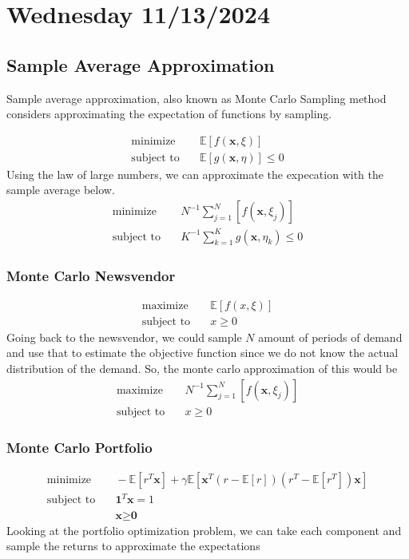 \section{Wednesday 11/13/2024}
\subsection{Sample Average Approximation}
Sample average approximation, also known as Monte Carlo Sampling method considers approximating the expectation of functions by sampling.

\begin{align}
  \text{minimize} & \quad \mathbb{E}[f(\textbf{x},\xi)] \\
  \text{subject to} & \quad  \mathbb{E}[g(\textbf{x},\eta)] \leq 0
\end{align}
Using the law of large numbers, we can approximate the expecation with the sample average below. 
\begin{align}
  \text{minimize} & \quad N^{-1} \sum_{j=1}^N [f(\textbf{x},\xi_j)] \\
  \text{subject to} & \quad K^{-1} \sum_{k=1}^K g(\textbf{x},\eta_k) \leq 0
\end{align}

\subsubsection{Monte Carlo Newsvendor}
\begin{align}
  \text{maximize} & \quad \mathbb{E}[f(x,\xi)] \\
  \text{subject to} & \quad x \geq 0
\end{align}
Going back to the newsvendor, we could sample $N$ amount of periods of demand and use that to estimate the objective function since we do not know the actual distribution of the demand. So, the monte carlo approximation of this would be
\begin{align}
  \text{maximize} & \quad N^{-1} \sum_{j=1}^N [f(\textbf{x},\xi_j)] \\
  \text{subject to} & \quad x \geq 0
\end{align}

\subsubsection{Monte Carlo Portfolio}
\begin{align}
  \text{minimize} & \quad -\mathbb{E}[r^T \textbf{x}] + \gamma \mathbb{E}[\textbf{x}^T(r-\mathbb{E}[r])(r^T -\mathbb{E}[r^T])\textbf{x}] \\
  \text{subject to} & \quad \textbf{1}^T \textbf{x} = 1 \\
  & \quad \textbf{x} \geq \textbf{0}
\end{align}
Looking at the portfolio optimization problem, we can take each component and sample the returns to approximate the expectations

